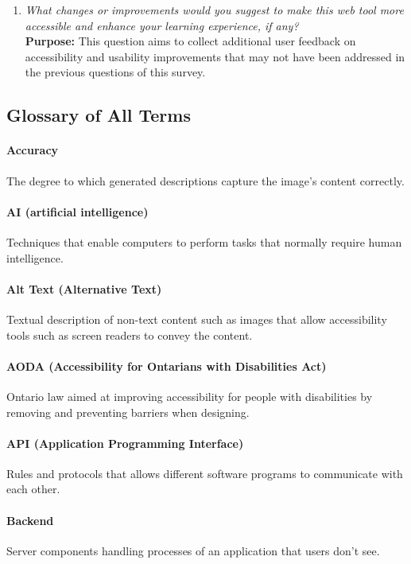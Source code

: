 \documentclass[12pt, titlepage]{article}
\begin{document}
\begin{enumerate}[label=UA-Q \arabic*., wide=0pt, leftmargin=*]
  \item \emph{What changes or improvements would you suggest to make
      this web tool more accessible and enhance your learning experience,
    if any?}\\[2mm]
    {\bf Purpose:} This question aims to collect additional user
    feedback on accessibility and usability improvements that may not
    have been addressed in the previous questions of this survey.
\end{enumerate}

\subsection{Glossary of All Terms}

\paragraph*{Accuracy}
The degree to which generated descriptions capture the image’s
content correctly.

\paragraph*{AI (artificial intelligence)}
Techniques that enable computers to perform tasks that normally
require human intelligence.

\paragraph*{Alt Text (Alternative Text)}
Textual description of non-text content such as images that allow
accessibility tools such as screen readers to convey the content.

\paragraph*{AODA (Accessibility for Ontarians with Disabilities Act)}
Ontario law aimed at improving accessibility for people with
disabilities by removing and preventing barriers when designing.

\paragraph*{API (Application Programming Interface)}
Rules and protocols that allows different software programs to
communicate with each other.

\paragraph*{Backend}
Server components handling processes of an application that users don't see.
\end{document}
